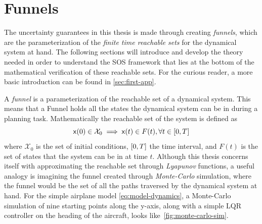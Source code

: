 \section{Funnels}
\label{sec:funnels}

The uncertainty guarantees in this thesis is made through creating
\textit{funnels}, which are the parameterization of the \textit{finite time
  reachable sets} for the dynamical system at hand. The following sections will
introduce and develop the theory needed in order to understand the \ac{SOS}
framework that lies at the bottom of the mathematical verification of these
reachable sets. For the curious reader, a more basic introduction can be found
in \cref{sec:first-app}.

A \textit{funnel} is a parameterization of the reachable set of a dynamical
system. This means that a Funnel holds all the states the dynamical system can
be in during a planning task. Mathematically the reachable set of the system is
defined as
\[
  {\mathbf{\mathsf{x}}}(0) \in \mathcal{X}_0 \implies {\mathbf{\mathsf{x}}}(t) \in F(t), \forall t \in
  \lbrack0,T\rbrack
\]
where \(\mathcal{X}_0\) is the set of initial conditions, \(\lbrack0,T\rbrack\) the time
interval, and \(F(t)\) is the set of states that the system can be in at time
\(t\). Although this thesis concerns itself with approximating the reachable set
through \textit{Lyapunov} functions, a useful analogy is imagining the funnel
created through \textit{Monte-Carlo} simulation, where the funnel would be the
set of all the paths traversed by the dynamical system at hand. For the simple
airplane model \cref{eq:model-dynamics}, a Monte-Carlo simulation of nine
starting points along the y-axis, along with a simple \ac{LQR} controller on the
heading of the aircraft, looks like~\cref{fig:monte-carlo-sim}.

